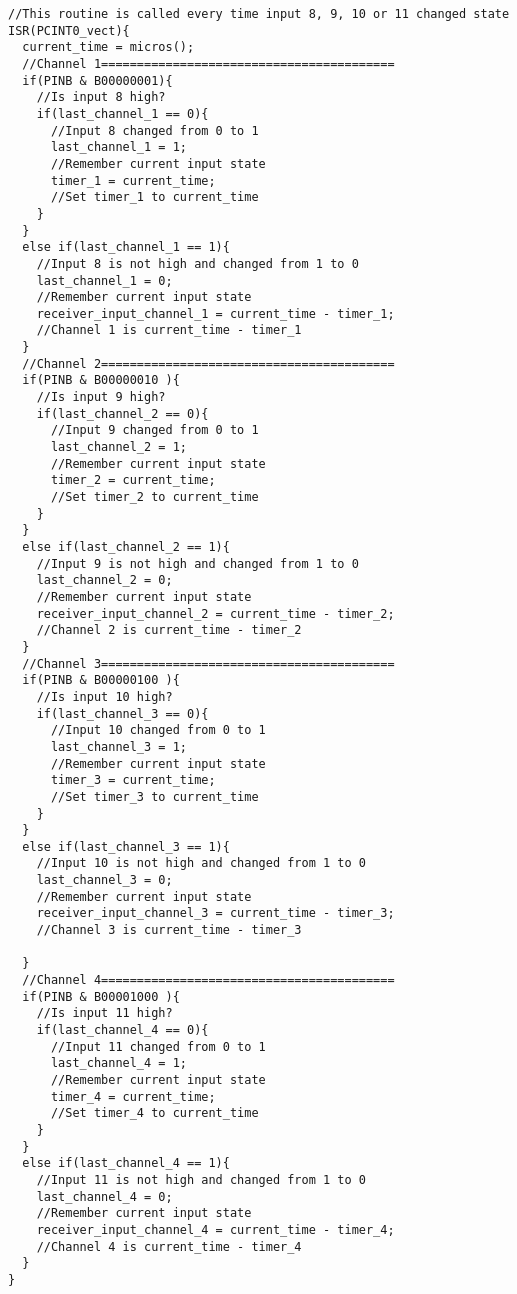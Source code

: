 \begin{lstlisting}
//This routine is called every time input 8, 9, 10 or 11 changed state
ISR(PCINT0_vect){
  current_time = micros();
  //Channel 1=========================================
  if(PINB & B00000001){                                        
    //Is input 8 high?
    if(last_channel_1 == 0){                                   
      //Input 8 changed from 0 to 1
      last_channel_1 = 1;                                      
      //Remember current input state
      timer_1 = current_time;                                  
      //Set timer_1 to current_time
    }
  }
  else if(last_channel_1 == 1){                                
    //Input 8 is not high and changed from 1 to 0
    last_channel_1 = 0;                                        
    //Remember current input state
    receiver_input_channel_1 = current_time - timer_1;         
    //Channel 1 is current_time - timer_1
  }
  //Channel 2=========================================
  if(PINB & B00000010 ){                                       
    //Is input 9 high?
    if(last_channel_2 == 0){                                   
      //Input 9 changed from 0 to 1
      last_channel_2 = 1;                                      
      //Remember current input state
      timer_2 = current_time;                                  
      //Set timer_2 to current_time
    }
  }
  else if(last_channel_2 == 1){                                
    //Input 9 is not high and changed from 1 to 0
    last_channel_2 = 0;                                        
    //Remember current input state
    receiver_input_channel_2 = current_time - timer_2;         
    //Channel 2 is current_time - timer_2
  }
  //Channel 3=========================================
  if(PINB & B00000100 ){                                       
    //Is input 10 high?
    if(last_channel_3 == 0){                                   
      //Input 10 changed from 0 to 1
      last_channel_3 = 1;                                      
      //Remember current input state
      timer_3 = current_time;                                  
      //Set timer_3 to current_time
    }
  }
  else if(last_channel_3 == 1){                                
    //Input 10 is not high and changed from 1 to 0
    last_channel_3 = 0;                                        
    //Remember current input state
    receiver_input_channel_3 = current_time - timer_3;         
    //Channel 3 is current_time - timer_3

  }
  //Channel 4=========================================
  if(PINB & B00001000 ){                                       
    //Is input 11 high?
    if(last_channel_4 == 0){                                   
      //Input 11 changed from 0 to 1
      last_channel_4 = 1;                                      
      //Remember current input state
      timer_4 = current_time;                                  
      //Set timer_4 to current_time
    }
  }
  else if(last_channel_4 == 1){                                
    //Input 11 is not high and changed from 1 to 0
    last_channel_4 = 0;                                        
    //Remember current input state
    receiver_input_channel_4 = current_time - timer_4;         
    //Channel 4 is current_time - timer_4
  }
}


\end{lstlisting}
